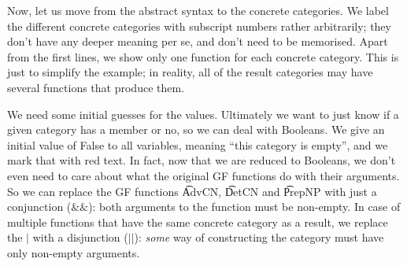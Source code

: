 Now, let us move from the \gf{} abstract syntax to the \pmcfg{} concrete
categories. We label the different concrete categories with
subscript numbers rather arbitrarily; they don't have any deeper
meaning per se, and don't need to be memorised. Apart from the first
lines, we show only one function for each concrete category. This is
just to simplify the example; in reality, all of the result categories
may have several functions that produce them.

\begin{EmptyItem}
\begin{HighlightingFancy}[]
\OtherTok{::=}    \FunctionTok{|}    \NormalTok{;}
\OtherTok{::=}   \FunctionTok{|}  \NormalTok{;}
\OtherTok{::=}    \NormalTok{;}
\OtherTok{::=}    \NormalTok{;}
\OtherTok{::=}    \NormalTok{;}
\OtherTok{::=}  \NormalTok{;}
\OtherTok{::=}  \NormalTok{;}
\OtherTok{::=}  \NormalTok{;}
\end{HighlightingFancy}
\end{EmptyItem}



We need some initial guesses for the values. Ultimately we want to
just know if a given category has a member or no, so we can deal with
Booleans. We give an initial value of False to all variables, meaning
``this category is empty'', and we mark that with red text.
In fact, now that we are reduced to Booleans, we don’t even need to
care about what the original GF functions do with their arguments. So
we can replace the GF functions \t{AdvCN}, \t{DetCN} and \t{PrepNP}
with just a conjunction ($\&\&$): both arguments to the function must
be non-empty. In case of multiple functions that have the same
concrete category as a result, we replace the $|$ with a disjunction
($||$): \emph{some} way of constructing the category must have only
non-empty arguments.

